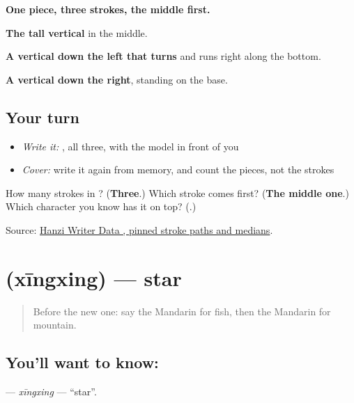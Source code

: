 \begin{quote}
\end{quote}

\textbf{One piece, three strokes, the middle first.}

\textbf{The tall vertical} in the middle.

\textbf{A vertical down the left that turns} and runs right along the bottom.

\textbf{A vertical down the right}, standing on the base.

\subsection*{Your turn}
\begin{itemize}
\raggedright
  \item \emph{Write it:} , all three, with the model in front of you
  \item \emph{Cover:} write it again from memory, and count the pieces, not the strokes
\end{itemize}

\begin{tcolorbox}[breakable,colback=teal!4,colframe=teal!35!black,title={Before you move on}]
How many strokes in ? (\textbf{Three}.) Which stroke comes first? (\textbf{The middle one}.) Which character you know has it on top? (\textbf{}.)

Source: \href{https://raw.githubusercontent.com/chanind/hanzi-writer-data/68d10a4b21150cae5e1ebbd223eed289cf32d90c/data/\%E5\%B1\%B1.json}{Hanzi Writer Data , pinned stroke paths and medians}.
\end{tcolorbox}
\section[\texorpdfstring{\zh{星星} (xīngxing)}{星星 (xīngxing)}]{ (xīngxing) — star}

\label{lesson:ZH-C68-xingxing}



\begin{quote}
Before the new one: say the Mandarin for fish, then the Mandarin for mountain.
\end{quote}

\subsection*{You'll want to know: }
\textbf{} — \emph{xīngxing} — \textquotedblleft{}star\textquotedblright{}.

